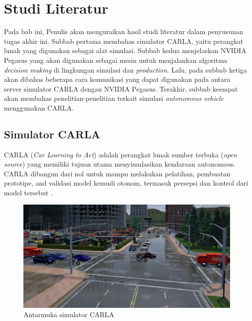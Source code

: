 \chapter{Studi Literatur}

Pada bab ini, Penulis akan menguraikan hasil studi literatur dalam penyusunan
tugas akhir ini. Subbab pertama membahas simulator CARLA, yaitu perangkat lunak
yang digunakan sebagai alat simulasi. Subbab kedua menjelaskan NVIDIA Pegasus
yang akan digunakan sebagai mesin untuk menjalankan algoritma \textit{decision
    making} di lingkungan simulasi dan \textit{production}. Lalu, pada subbab ketiga
akan dibahas beberapa cara komunikasi yang dapat digunakan pada antara server
simulator CARLA dengan NVIDIA Pegasus. Terakhir, subbab keempat akan membahas
penelitian-penelitian terkait simulasi \textit{autonomous vehicle} menggunakan
CARLA.

\section{Simulator CARLA}

CARLA (\textit{Car Learning to Act}) adalah perangkat lunak sumber terbuka
(\textit{open source}) yang memiliki tujuan utama menyimulasikan kendaraan
autonomous. CARLA dibangun dari nol untuk mampu melakukan pelatihan, pembuatan
prototipe, and validasi model kemudi otonom, termasuk persepsi dan kontrol dari
model tersebut \parencite{dos_carla}.

\begin{center}
    \begin{figure}
        \includegraphics[width=1.0\textwidth]{resources/chapter-2/CARLA.jpg}
        \caption{Antarmuka simulator CARLA \parencite{loze_carlaDemocratizes}}
    \end{figure}
\end{center}

